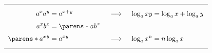 \begin{multicols}{2}
\begin{CheatsheetEntryFrame}
\begin{center}
\begin{tabularx}{\textwidth}{Ccc}
            && %
                \\ %

            $\W
                        \begin{aligned}
                            \X a^x a^y         &= a^{x+y} \\
                            \X a^x b^x         &= \parens*{ab}^x \\
                            \X \parens*{a^x}^y &= a^{xy} \\
                        \end{aligned}
            $
                &
                    $\W
                        \begin{gathered}
                            \X \longrightarrow \\
                            \X \\
                            \X \longrightarrow
                        \end{gathered}
                    $
                &
                    $\W
                        \begin{aligned}
                            \X \log_a{xy} &= \log_a{x} + \log_a{y} \\
                            \X & \\
                            \X \log_a{x^n} &= n \log_a{x}
                        \end{aligned}
                    $
                \\

            && %
                \\ %


\end{tabularx}
\end{center}
\end{CheatsheetEntryFrame}
\end{multicols}
